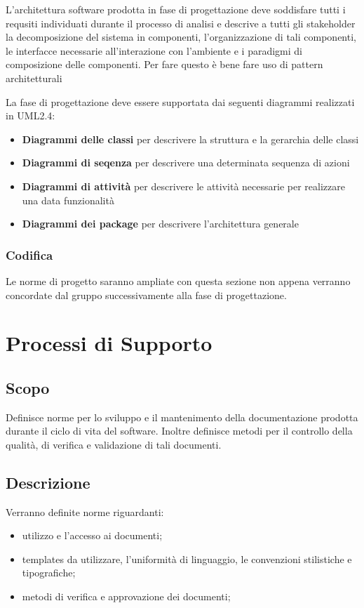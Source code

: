\documentclass[12pt,a4paper]{article}
\begin{document}
L'architettura software prodotta in fase di progettazione deve soddisfare tutti i requsiti individuati durante il processo di analisi e descrive a tutti gli stakeholder la decomposizione del sistema in componenti, l'organizzazione di tali componenti, le interfacce necessarie all'interazione con l'ambiente e i paradigmi di composizione delle componenti. Per fare questo è bene fare uso di pattern architetturali

La fase di progettazione deve essere supportata dai seguenti diagrammi realizzati in UML2.4:
\begin{itemize}
\item \textbf{Diagrammi delle classi} per descrivere la struttura e la gerarchia delle classi
\item \textbf{Diagrammi di seqenza} per descrivere una determinata sequenza di azioni
\item \textbf{Diagrammi di attività} per descrivere le attività necessarie per realizzare una data funzionalità
\item \textbf{Diagrammi dei package} per descrivere l'architettura generale
\end{itemize}

\subsubsection{Codifica}
Le norme di progetto saranno ampliate con questa sezione non appena verranno concordate dal gruppo successivamente alla fase di progettazione.

\newpage

\section{Processi di Supporto} %

\subsection{Scopo}
Definisce norme per lo sviluppo e il mantenimento della documentazione prodotta durante il ciclo di vita del software. Inoltre definisce metodi per il controllo della qualità, di verifica e validazione di tali documenti.

\subsection{Descrizione}
Verranno definite norme riguardanti:
\begin{itemize}
  \item utilizzo e l'accesso ai documenti;
  \item templates da utilizzare, l'uniformità di linguaggio, le convenzioni stilistiche e tipografiche;
  \item metodi di verifica e approvazione dei documenti;
\end{itemize}
\end{document}
